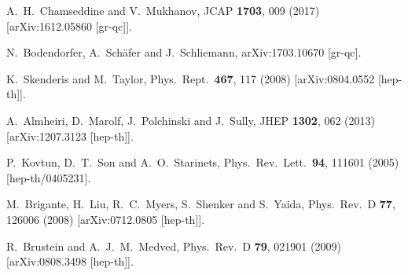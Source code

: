 \documentclass[article,twocolumn]{revtex4}
\begin{document}
\begin{thebibliography}{99}
  A.~H.~Chamseddine and V.~Mukhanov,
  JCAP {\bf 1703}, 009 (2017)
  [arXiv:1612.05860 [gr-qc]].

  N.~Bodendorfer, A.~Sch\"afer and J.~Schliemann,
  arXiv:1703.10670 [gr-qc].
  
  K.~Skenderis and M.~Taylor,
  Phys.\ Rept.\  {\bf 467}, 117 (2008)
  [arXiv:0804.0552 [hep-th]].

  A.~Almheiri, D.~Marolf, J.~Polchinski and J.~Sully,
  JHEP {\bf 1302}, 062 (2013)
  [arXiv:1207.3123 [hep-th]].
  
  P.~Kovtun, D.~T.~Son and A.~O.~Starinets,
  Phys.\ Rev.\ Lett.\  {\bf 94}, 111601 (2005)
  [hep-th/0405231].

  M.~Brigante, H.~Liu, R.~C.~Myers, S.~Shenker and S.~Yaida,
  Phys.\ Rev.\ D {\bf 77}, 126006 (2008)
  [arXiv:0712.0805 [hep-th]].

  R.~Brustein and A.~J.~M.~Medved,
  Phys.\ Rev.\ D {\bf 79}, 021901 (2009)
  [arXiv:0808.3498 [hep-th]].
  

\end{thebibliography}
\end{document}

